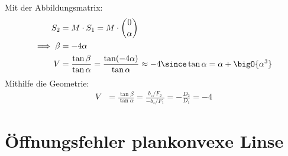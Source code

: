 \documentclass[ex]{exercise}
\begin{document}
\subsection{}
Mit der Abbildungsmatrix:
\begin{align*}
    S_2 &= M \cdot S_1 = M \cdot \binom{0}{\alpha}\\
    \implies \beta &= -4\alpha\\
    V &= \frac{\tan\beta}{\tan\alpha}
    = \frac{\tan(-4\alpha)}{\tan\alpha}
    \approx -4 \since \tan\alpha =\alpha + \bigO{\alpha^3}
\end{align*}
Mithilfe die Geometrie:
\begin{align*}
    V &= \frac{\tan\beta}{\tan\alpha}
    = \frac{b_z / F_2}{-b_z / F_1}
    = - \frac{D_2}{D_1} 
    = -4
\end{align*}

\section{Öffnungsfehler plankonvexe Linse}
\end{document}

